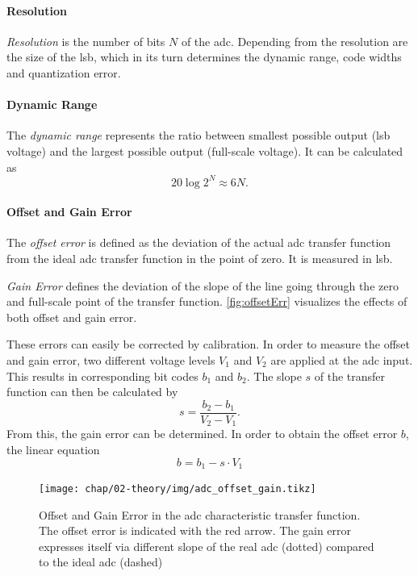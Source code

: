 \paragraph{Resolution}
\textit{Resolution} is the number of bits $N$ of the \gls{adc}.
Depending from the resolution are the size of the \gls{lsb}, which in its turn determines the dynamic range, code widths and quantization error.
\paragraph{Dynamic Range}
The \textit{dynamic range} represents the ratio between smallest possible output (\gls{lsb} voltage) and the largest possible output (full-scale voltage).
It can be calculated as
\begin{equation}
	20 \log 2^{N} \approx 6N.
\end{equation}

\paragraph{Offset and Gain Error}
The \textit{offset error} is defined as the deviation of the actual \gls{adc} transfer function from the ideal \gls{adc} transfer function in the point of zero. It is measured in \gls{lsb}. 
 
\textit{Gain Error} defines the deviation of the slope of the line going through the zero and full-scale point of the transfer function. %
\autoref{fig:offsetErr} visualizes the effects of both offset and gain error. 

These errors can easily be corrected by calibration. 
In order to measure the offset and gain error, two different voltage levels $V_1$ and $V_2$ are applied at the \gls{adc} input. 
This results in corresponding bit codes $b_1$ and $b_2$.
The slope $s$ of the transfer function can then be calculated by
\begin{equation}
	s = \frac{b_2 - b_1}{V_2 - V_1}.
\end{equation}
From this, the gain error can be determined.
In order to obtain the offset error $b$, the linear equation
\begin{equation}
	b = b_1 - s\cdot V_1
\end{equation}

\begin{figure}[tbh]
	\centering
	\texttt{[image: chap/02-theory/img/adc\_offset\_gain.tikz]}
	\caption[Effects of Offset and Fain error in ADC]{Offset and Gain Error in the \gls{adc} characteristic transfer function. The offset error is indicated with the red arrow. The gain error expresses itself via different slope of the real \gls{adc} (dotted) compared to the ideal \gls{adc} (dashed)}
	\label{fig:offsetErr}
\end{figure}

